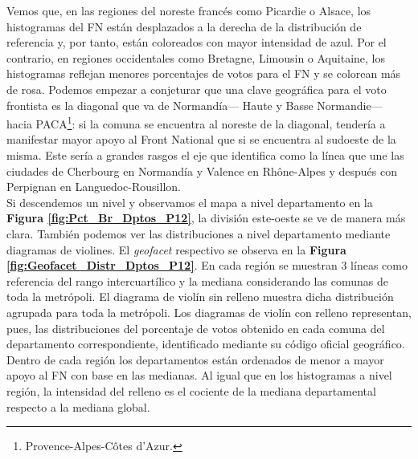 Vemos que, en las regiones del noreste francés como Picardie o Alsace, los histogramas del FN están desplazados a la derecha de la distribución de referencia y, por tanto, están coloreados con mayor intensidad de azul. Por el contrario, en regiones occidentales como Bretagne, Limousin o Aquitaine, los histogramas reflejan menores porcentajes de votos para el FN y se colorean más de rosa. Podemos empezar a conjeturar que una clave geográfica para el voto frontista es la diagonal que va de Normandía--- Haute y Basse Normandie--- hacia PACA\footnote{Provence-Alpes-Côtes d'Azur.}: si la comuna se encuentra al noreste de la diagonal, tendería a manifestar mayor apoyo al Front National que si se encuentra al sudoeste de la misma. Este sería a grandes rasgos el eje que \textcite{Goodliffe16} identifica como la línea que une las ciudades de Cherbourg en Normandía y Valence en Rhône-Alpes y después con Perpignan en Languedoc-Rousillon.\\ 

Si descendemos un nivel y observamos el mapa a nivel departamento en la \textbf{Figura \ref{fig:Pct_Br_Dptos_P12}}, la división este-oeste se ve de manera más clara. También podemos ver las distribuciones a nivel departamento mediante diagramas de violines. El \textit{geofacet} respectivo se observa en la \textbf{Figura \ref{fig:Geofacet_Distr_Dptos_P12}}. En cada región se muestran 3 líneas como referencia del rango intercuartílico y la mediana considerando las comunas de toda la metrópoli. El diagrama de violín sin relleno muestra dicha distribución agrupada para toda la metrópoli. Los diagramas de violín con relleno representan, pues, las distribuciones del porcentaje de votos obtenido en cada comuna del departamento correspondiente, identificado mediante su código oficial geográfico. Dentro de cada región los departamentos están ordenados de menor a mayor apoyo al FN con base en las medianas. Al igual que en los histogramas a nivel región, la intensidad del relleno es el cociente de la mediana departamental respecto a la mediana global.\\ 

